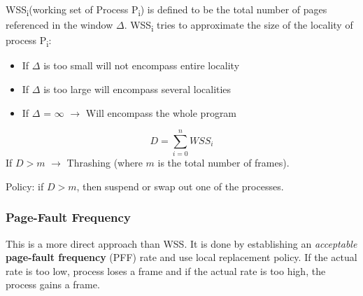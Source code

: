 \documentclass[11pt]{article}
\begin{document}
WSS\textsubscript{i}(working set of Process P\textsubscript{i}) is defined to be the total number of pages referenced in the window \(\Delta\).
WSS\textsubscript{i} tries to approximate the size of the locality of process P\textsubscript{i}:
\begin{itemize}
\item If \(\Delta\) is too small will not encompass entire locality
\item If \(\Delta\) is too large will encompass several localities
\item If \(\Delta\) = \(\infty\) \(\rightarrow\) Will encompass the whole program
\end{itemize}
\begin{equation}
D = \sum\limits_{i=0}^n WSS_i
\end{equation}
If \(D > m\) \(\rightarrow\) Thrashing (where \(m\) is the total number of frames).

Policy: if \(D > m\), then suspend or swap out one of the processes.

\subsubsection{Page-Fault Frequency}
\label{sec:orge0a5dfc}
This is a more direct approach than WSS.
It is done by establishing an \emph{acceptable} \textbf{page-fault frequency} (PFF) rate and use local replacement policy.
If the actual rate is too low, process loses a frame and if the actual rate is too high, the process gains a frame.
\end{document}
